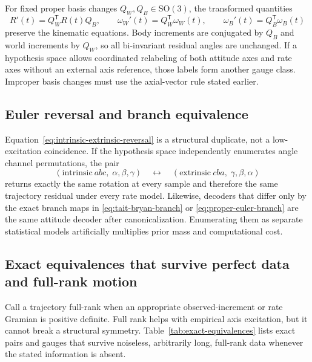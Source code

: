 \documentclass[11pt]{article}
\newcommand{\SO}{\mathrm{SO}(3)}
\newcommand{\T}{\mathsf{T}}
\begin{document}
    For fixed proper basis changes $Q_W,Q_B\in\SO$, the transformed quantities
    \begin{equation}
        R'(t)=Q_W^{\T} R(t)Q_B,
        \qquad
        \omega_W'(t)=Q_W^{\T}\omega_W(t),
        \qquad
        \omega_B'(t)=Q_B^{\T}\omega_B(t)
    \end{equation}
    preserve the kinematic equations. Body increments are conjugated by $Q_B$ and world
    increments by $Q_W$, so all bi-invariant residual angles are unchanged. If a hypothesis
    space allows coordinated relabeling of both attitude axes and rate axes without an
    external axis reference, those labels form another gauge class. Improper basis changes
    must use the axial-vector rule stated earlier.

    \subsection{Euler reversal and branch equivalence}

    Equation~\eqref{eq:intrinsic-extrinsic-reversal} is a structural duplicate, not a
    low-excitation coincidence. If the hypothesis space independently enumerates angle
    channel permutations, the pair
    \begin{equation}
        (\mathrm{intrinsic}\ abc,\;\alpha,\beta,\gamma)
    \quad\longleftrightarrow\quad
    (\mathrm{extrinsic}\ cba,\;\gamma,\beta,\alpha)
    \end{equation}
    returns exactly the same rotation at every sample and therefore the same trajectory
    residual under every rate model. Likewise, decoders that differ only by the exact branch
    maps in \eqref{eq:tait-bryan-branch} or \eqref{eq:proper-euler-branch} are the same
    attitude decoder after canonicalization. Enumerating them as separate statistical models
    artificially multiplies prior mass and computational cost.

    \subsection{Exact equivalences that survive perfect data and full-rank motion}

    Call a trajectory full-rank when an appropriate observed-increment or rate Gramian is
    positive definite. Full rank helps with empirical axis excitation, but it cannot break a
    structural symmetry. Table~\ref{tab:exact-equivalences} lists exact pairs and gauges that
    survive noiseless, arbitrarily long, full-rank data whenever the stated information is
    absent.
\end{document}

